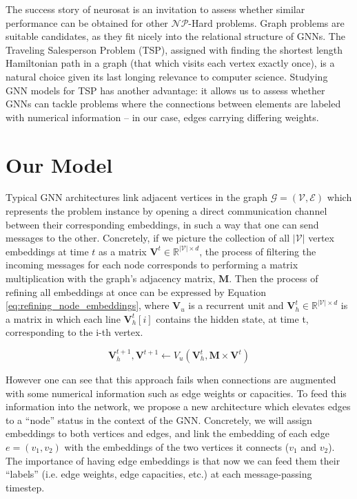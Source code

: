 \documentclass{article}
\begin{document}
The success story of neurosat is an invitation to assess whether similar performance can be obtained for other $\mathcal{NP}$-Hard problems. Graph problems are suitable candidates, as they fit nicely into the relational structure of GNNs. The Traveling Salesperson Problem (TSP), assigned with finding the shortest length Hamiltonian path in a graph (that which visits each vertex exactly once), is a natural choice given its last longing relevance to computer science. Studying GNN models for TSP has another advantage: it allows us to assess whether GNNs can tackle problems where the connections between elements are labeled with numerical information -- in our case, edges carrying differing weights.

\section{Our Model}

Typical GNN architectures link adjacent vertices in the graph $\mathcal{G} = (\mathcal{V}, \mathcal{E})$ which represents the problem instance by opening a direct communication channel between their corresponding embeddings, in such a way that one can send messages to the other. Concretely, if we picture the collection of all $|\mathcal{V}|$ vertex embeddings at time $t$ as a matrix $\mathbf{V}^t \in \mathbb{R}^{|\mathcal{V}| \times d}$, the process of filtering the incoming messages for each node corresponds to performing a matrix multiplication with the graph's adjacency matrix, $\mathbf{M}$. Then the process of refining all embeddings at once can be expressed by Equation \ref{eq:refining_node_embeddings}, where $\mathbf{V}_u$ is a recurrent unit and $\mathbf{V}_h^t \in \mathbb{R}^{|\mathcal{V}| \times d}$ is a matrix in which each line $\mathbf{V}_h^t[i]$ contains the hidden state, at time t, corresponding to the i-th vertex.

\begin{equation} \label{eq:refining_node_embeddings}
\mathbf{V}_h^{t+1}, \mathbf{V}^{t+1} \leftarrow V_u( \mathbf{V}_h^t, \mathbf{M} \times \mathbf{V}^t )
\end{equation}

However one can see that this approach fails when connections are augmented with some numerical information such as edge weights or capacities. To feed this information into the network, we propose a new architecture which elevates edges to a ``node'' status in the context of the GNN. Concretely, we will assign embeddings to both vertices and edges, and link the embedding of each edge $e=(v_1,v_2)$ with the embeddings of the two vertices it connects ($v_1$ and $v_2$). The importance of having edge embeddings is that now we can feed them their ``labels'' (i.e. edge weights, edge capacities, etc.) at each message-passing timestep.
\end{document}
